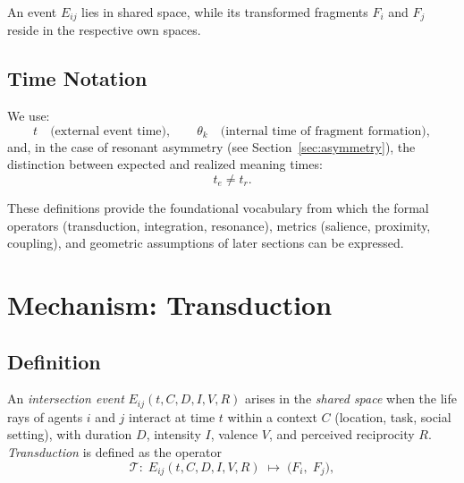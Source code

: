 \documentclass[12pt,a4paper]{article}
\begin{document}
An event $E_{ij}$ lies in shared space, while its transformed fragments
$F_i$ and $F_j$ reside in the respective own spaces.

\subsection{Time Notation}

We use:
\[
t \quad \text{(external event time)}, \qquad
\theta_k \quad \text{(internal time of fragment formation)},
\]
and, in the case of resonant asymmetry (see Section~\ref{sec:asymmetry}),
the distinction between expected and realized meaning times:
\[
t_e \neq t_r.
\]

These definitions provide the foundational vocabulary from which the
formal operators (transduction, integration, resonance), metrics
(salience, proximity, coupling), and geometric assumptions of later
sections can be expressed.

\section{Mechanism: Transduction}

\subsection{Definition}
An \emph{intersection event} $E_{ij}(t,C,D,I,V,R)$ arises in the
\emph{shared space} when the life rays of agents $i$ and $j$
interact at time $t$ within a context $C$ (location, task, social
setting), with duration $D$, intensity $I$, valence $V$, and
perceived reciprocity $R$.
\emph{Transduction} is defined as the operator
\begin{equation}
\mathcal{T}:\;
E_{ij}(t,C,D,I,V,R)
\;\mapsto\;
\big(F_i,\;F_j\big),
\end{equation}
\end{document}
